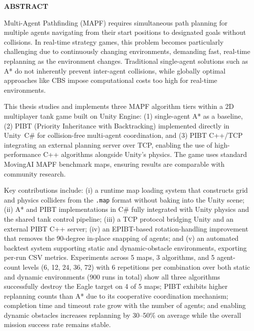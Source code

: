 \documentclass[../DoAn.tex]{subfiles}
\begin{document}
\begin{center}
    \Large{\textbf{ABSTRACT}}\\
\end{center}
\vspace{1cm}

Multi-Agent Pathfinding (MAPF) requires simultaneous path planning for multiple agents
navigating from their start positions to designated goals without collisions. In real-time
strategy games, this problem becomes particularly challenging due to continuously changing
environments, demanding fast, real-time replanning as the environment changes. Traditional
single-agent solutions such as A* do not inherently prevent inter-agent collisions, while
globally optimal approaches like CBS impose computational costs too high for real-time
environments.

This thesis studies and implements three MAPF algorithm tiers within a 2D multiplayer
tank game built on Unity Engine: (1) single-agent A* as a baseline, (2) PIBT (Priority
Inheritance with Backtracking) implemented directly in Unity~C\# for collision-free
multi-agent coordination, and (3) PIBT C++/TCP integrating an external planning server
over TCP, enabling the use of high-performance C++ algorithms alongside Unity's physics.
The game uses standard MovingAI MAPF benchmark maps, ensuring results are comparable
with community research.

Key contributions include: (i) a runtime map loading system that constructs grid and
physics colliders from the \texttt{.map} format without baking into the Unity scene;
(ii) A* and PIBT implementations in C\# fully integrated with Unity physics and the
shared tank control pipeline; (iii) a TCP protocol bridging Unity and an external
PIBT C++ server; (iv) an EPIBT-based rotation-handling improvement that removes the
90-degree in-place snapping of agents; and (v) an automated backtest system supporting
static and dynamic-obstacle environments, exporting per-run CSV metrics. Experiments across
5 maps, 3 algorithms, and 5 agent-count levels (6, 12, 24, 36, 72) with 6 repetitions per
combination over both static and dynamic environments (900 runs in total)
show all three algorithms successfully destroy the Eagle target on 4 of 5 maps;
PIBT exhibits higher replanning counts than A* due to its cooperative coordination
mechanism; completion time and timeout rate grow with the number of agents; and enabling
dynamic obstacles increases replanning by 30--50\% on average while the overall mission
success rate remains stable.
\end{document}
